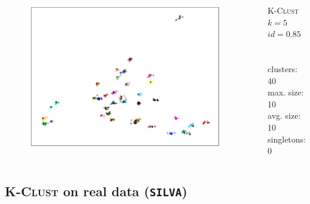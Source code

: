 \documentclass{beamer}
\begin{document}
\begin{frame}
  \begin{columns}[c]
    \begin{figure}[h]
      \includegraphics[width=0.95\textwidth]{graphics/MDS_Synthetic.pdf}
    \end{figure}

    \textsc{K-Clust} \\
    $k = 5$ \\
    $id = 0.85$ \\
    \hfill \\
    \hfill \\
    clusters: 40 \\
    max. size: 10 \\
    avg. size: 10 \\
    singletons: 0
  \end{columns}
\end{frame}


\subsection{\textsc{K-Clust} on real data (\texttt{SILVA})}
\end{document}
